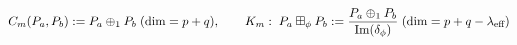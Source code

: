 \documentclass[preview]{standalone}
\begin{document}
\begin{align*}
\special{dvisvgm:raw <g id='unique000'>}C_m(P_a,P_b) := P_a \oplus_1 P_b\;(\dim = p+q), \qquad K_m:\; P_a \boxplus_\phi P_b := \frac{P_a \oplus_1 P_b}{\operatorname{Im}(\delta_\phi)}\;(\dim = p+q-\lambda_{\text{eff}})\special{dvisvgm:raw </g>}
\end{align*}
\end{document}

